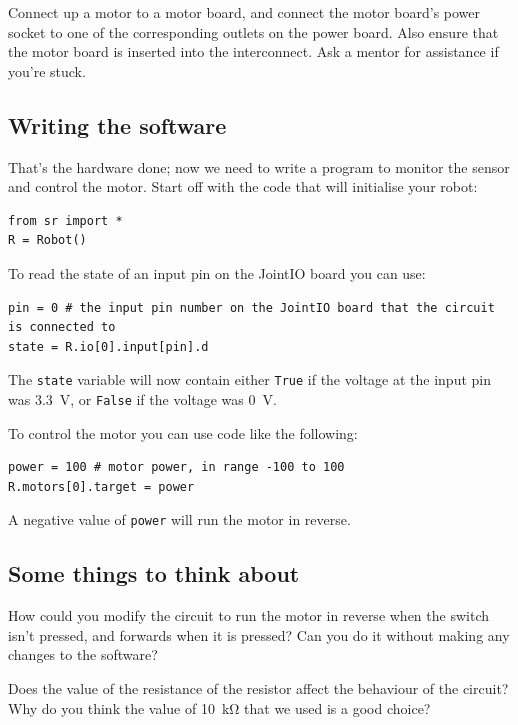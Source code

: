\documentclass{article}
\begin{document}
Connect up a motor to a motor board, and connect the motor board's power socket
to one of the corresponding outlets on the power board. Also ensure that the
motor board is inserted into the interconnect. Ask a mentor for assistance if
you're stuck.

\subsection{Writing the software}

That's the hardware done; now we need to write a program to monitor the sensor
and control the motor. Start off with the code that will initialise your robot:

\begin{verbatim}
from sr import *
R = Robot()
\end{verbatim}

To read the state of an input pin on the JointIO board you can use:

\begin{verbatim}
pin = 0 # the input pin number on the JointIO board that the circuit is connected to
state = R.io[0].input[pin].d
\end{verbatim}

The \texttt{state} variable will now contain either
\texttt{True} if the voltage at the input pin was \SI{3.3}{\volt},
or \texttt{False} if the voltage was \SI{0}{\volt}.

To control the motor you can use code like the following:

\begin{verbatim}
power = 100 # motor power, in range -100 to 100
R.motors[0].target = power
\end{verbatim}

A negative value of \texttt{power} will run the motor in reverse.

\subsection{Some things to think about}

How could you modify the circuit to run the motor in reverse when the switch
isn't pressed, and forwards when it is pressed? Can you do it without making
any changes to the software?

Does the value of the resistance of the resistor affect the behaviour of the
circuit? Why do you think the value of \SI{10}{\kilo\ohm} that we used is a
good choice?
\end{document}
